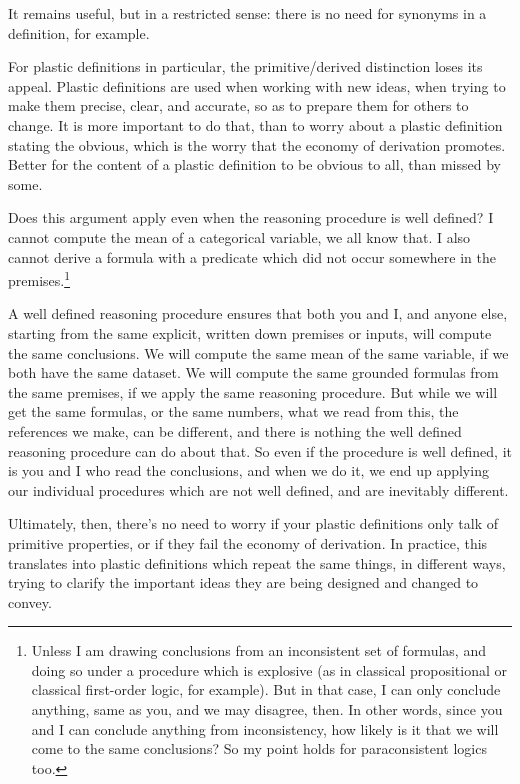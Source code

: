 It remains useful, but in a restricted sense: there is no need for synonyms in a definition, for example.

For plastic definitions in particular, the primitive/derived distinction loses its appeal. Plastic definitions are used when working with new ideas, when trying to make them precise, clear, and accurate, so as to prepare them for others to change. It is more important to do that, than to worry about a plastic definition stating the obvious, which is the worry that the economy of derivation promotes. Better for the content of a plastic definition to be obvious to all, than missed by some. 

Does this argument apply even when the reasoning procedure is well defined? I cannot compute the mean of a categorical variable, we all know that. I also cannot derive a formula with a predicate which did not occur somewhere in the premises.\footnote{Unless I am drawing conclusions from an inconsistent set of formulas, and doing so under a procedure which is explosive (as in classical propositional or classical first-order logic, for example). But in that case, I can only conclude anything, same as you, and we may disagree, then. In other words, since you and I can conclude anything from inconsistency, how likely is it that we will come to the same conclusions? So my point holds for paraconsistent logics too.} 

A well defined reasoning procedure ensures that both you and I, and anyone else, starting from the same explicit, written down premises or inputs, will compute the same conclusions. We will compute the same mean of the same variable, if we both have the same dataset. We will compute the same grounded formulas from the same premises, if we apply the same reasoning procedure. But while we will get the same formulas, or the same numbers, what we read from this, the references we make, can be different, and there is nothing the well defined reasoning procedure can do about that. So even if the procedure is well defined, it is you and I who read the conclusions, and when we do it, we end up applying our individual procedures which are not well defined, and are inevitably different.

Ultimately, then, there's no need to worry if your plastic definitions only talk of primitive properties, or if they fail the economy of derivation. In practice, this translates into plastic definitions which repeat the same things, in different ways, trying to clarify the important ideas they are being designed and changed to convey.

